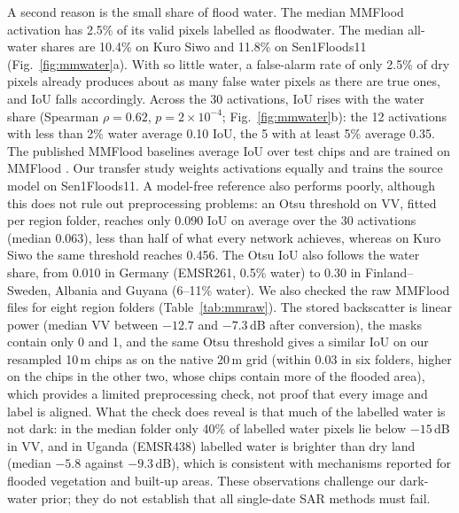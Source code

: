 A second reason is the small share of flood water. The median MMFlood activation has 2.5\% of its valid pixels labelled as floodwater. The median all-water shares are 10.4\% on Kuro Siwo and 11.8\% on Sen1Floods11 (Fig.~\ref{fig:mmwater}a). With so little water, a false-alarm rate of only 2.5\% of dry pixels already produces about as many false water pixels as there are true ones, and IoU falls accordingly. Across the 30 activations, IoU rises with the water share (Spearman $\rho=0.62$, $p=2\times10^{-4}$; Fig.~\ref{fig:mmwater}b): the 12 activations with less than 2\% water average 0.10 IoU, the 5 with at least 5\% average 0.35. The published MMFlood baselines average IoU over test chips and are trained on MMFlood \citep{montello2022mmflood}. Our transfer study weights activations equally and trains the source model on Sen1Floods11. A model-free reference also performs poorly, although this does not rule out preprocessing problems: an Otsu threshold on VV, fitted per region folder, reaches only 0.090 IoU on average over the 30 activations (median 0.063), less than half of what every network achieves, whereas on Kuro Siwo the same threshold reaches 0.456. The Otsu IoU also follows the water share, from 0.010 in Germany (EMSR261, 0.5\% water) to 0.30 in Finland--Sweden, Albania and Guyana (6--11\% water). We also checked the raw MMFlood files for eight region folders (Table~\ref{tab:mmraw}). The stored backscatter is linear power (median VV between $-12.7$ and $-7.3$\,dB after conversion), the masks contain only 0 and 1, and the same Otsu threshold gives a similar IoU on our resampled 10\,m chips as on the native 20\,m grid (within 0.03 in six folders, higher on the chips in the other two, whose chips contain more of the flooded area), which provides a limited preprocessing check, not proof that every image and label is aligned. What the check does reveal is that much of the labelled water is not dark: in the median folder only 40\% of labelled water pixels lie below $-15$\,dB in VV, and in Uganda (EMSR438) labelled water is brighter than dry land (median $-5.8$ against $-9.3$\,dB), which is consistent with mechanisms reported for flooded vegetation and built-up areas. These observations challenge our dark-water prior; they do not establish that all single-date SAR methods must fail.

